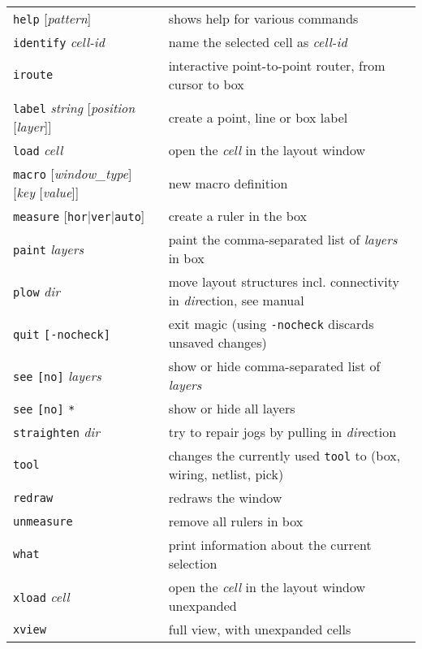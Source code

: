 \documentclass[10pt,a4paper]{article}
\newcommand{\mac}[1]{\texttt{#1}}
\newcommand{\argu}[1]{\textit{#1}}
\newcommand{\mouse}[1]{\texttt{#1}}
\begin{document}
\begin{tabular}{p{}p{}}
		\mac{help} [\argu{pattern}] & shows help for various commands\\
		\mac{identify} \argu{cell-id} & name the selected cell as \argu{cell-id}\\
		\mac{iroute} & interactive point-to-point router, from cursor to box\\
		\mac{label} \argu{string} [\argu{position} [\argu{layer}]] & create a point, line or box label\\
		\mac{load} \argu{cell} & open the \argu{cell} in the layout window\\
		\mac{macro} [\argu{window\_type}] [\argu{key} [\argu{value}]] & new macro definition \\
		\mac{measure} [\mac{hor}|\mac{ver}|\mac{auto}] & create a ruler in the box\\
		\mac{paint} \argu{layers} & paint the comma-separated list of \argu{layers} in box\\
		\mac{plow} \argu{dir} & move layout structures incl. connectivity in \argu{dir}ection, see manual\\
		\mac{quit} \mac{[-nocheck]} & exit magic (using \mac{-nocheck} discards unsaved changes)\\
		\mac{see} \mac{[no]} \argu{layers} & show or hide comma-separated list of \argu{layers}\\
		\mac{see} \mac{[no]} \mac{*} & show or hide all layers\\
		\mac{straighten} \argu{dir} & try to repair jogs by pulling in \argu{dir}ection\\
		\mac{tool} & changes the currently used \mouse{tool} to (box, wiring, netlist, pick)\\
		\mac{redraw} & redraws the window\\
		\mac{unmeasure} & remove all rulers in box\\
		\mac{what} & print information about the current selection\\
		\mac{xload} \argu{cell} & open the \argu{cell} in the layout window unexpanded\\
		\mac{xview} & full view, with unexpanded cells\\
		\bottomrule
	\end{tabular}
	
	\newpage
\end{document}
